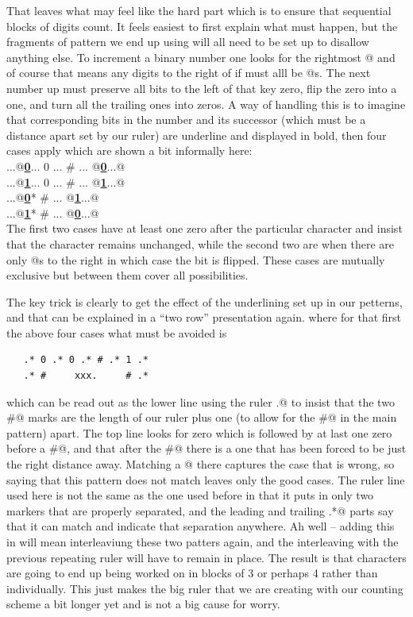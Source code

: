 That leaves what may feel like the hard part which is to ensure that
sequential blocks of digits count. It feels easiest to first explain
what must happen, but the fragments of pattern we end up using will all
need to be set up to disallow anything else. To increment a binary
number one looks for the rightmost @ and of course that means
any digits to the right of if must alll be @s. The next number
up must preserve all bits to the left of that key zero, flip the zero into
a one, and turn all the trailing ones into zeros. A way of handling this
is to imagine that corresponding bits in the number and its successor
(which must be a distance apart set by our ruler) are underline and
displayed in bold, then four cases apply which are shown a bit
informally here: \\
\verb@       ...@\textbf{\underline{0}}\verb@ ... 0 ... # ... @\textbf{\underline{0}}\verb@ ...@\\
\verb@       ...@\textbf{\underline{1}}\verb@ ... 0 ... # ... @\textbf{\underline{1}}\verb@ ...@\\
\verb@       ...@\textbf{\underline{0}}*    # ... @\textbf{\underline{1}}\verb@ ...@\\
\verb@       ...@\textbf{\underline{1}}*    # ... @\textbf{\underline{0}}\verb@ ...@\\
The first two cases have at least one zero after the particular
character and insist that the character remains unchanged, while the
second two are when there are only @s to the right in which case the
bit is flipped. These cases are mutually exclusive but between them cover
all possibilities.

The key trick is clearly to get the effect of the underlining set up
in our petterns, and that can be explained in a ``two row'' presentation
again. where for that first the above four cases what must be avoided is
\begin{verbatim}
   .* 0 .* 0 .* # .* 1 .*
   .* #     xxx.     # .*
\end{verbatim}
which can be read out as the lower line using the ruler \verb@xxx.@ to insist
that the two \verb@#@ marks are the length of our ruler plus one (to allow for
the \verb@#@ in the main pattern) apart. The top line looks for zero which is
followed by at last one zero before a \verb@#@, and that after the \verb@#@
there is a one that has been forced to be just the right distance away.
Matching a @ there captures the case that is wrong, so saying that this
pattern does not match leaves only the good cases. The ruler line used here
is not the same as the one used before in that it puts in only two markers
that are properly separated, and the leading and trailing \verb@.*@ parts
say that it can match and indicate that separation anywhere. Ah well --
adding this in will mean interleaviung these two patters again, and the
interleaving with the previous repeating ruler will have to remain in place.
The result is that characters are going to end up being worked on in
blocks of 3 or perhaps 4 rather than individually. This just makes
the big ruler that we are creating with our counting scheme a bit longer
yet and is not a big cause for worry.

